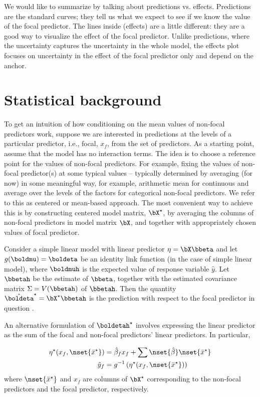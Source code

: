 We would like to summarize by talking about predictions vs. effects. Predictions are the standard curves; they tell us what we expect to see if we know the value of the focal predictor. The lines inside (effects) are a little different: they are a good way to visualize the effect of the focal predictor. Unlike predictions, where the uncertainty captures the uncertainty in the whole model, the effects plot focuses on uncertainty in the effect of the focal predictor only and depend on the anchor.



\section{Statistical background}

To get an intuition of how conditioning on the mean values of non-focal predictors work, suppose we are interested in predictions at the levels of a particular predictor, i.e., focal, $x_f$, from the set of predictors. As a starting point, assume that the model has no interaction terms. The idea is to choose a reference point for the values of non-focal predictors. For example, fixing the values of non-focal predictor(s) at some typical values -- typically determined by averaging (for now) in some meaningful way, for example, arithmetic mean  for continuous and average over the levels of the factors for categorical non-focal predictors. We refer to this as centered or mean-based approach. The most convenient way to achieve this is by constructing centered model matrix, $\bX^\star$, by averaging the columns of non-focal predictors in model matrix $\bX$, and together with appropriately chosen values of focal predictor.


Consider a simple linear model with linear predictor $\eta = \bX\bbeta$ and let $g(\boldmu) = \boldeta$ be an identity link function (in the case of simple linear model), where $\boldmuh$ is the expected value of response variable $\hat{y}$. Let $\bbetah$ be the estimate of $\bbeta$, together with the estimated covariance matrix $\Sigma = V(\bbetah)$ of $\bbetah$. Then the quantity $\hat{\boldeta}^\star = \bX^\star\bbetah$ is the prediction with respect to the focal predictor in question \citep{fox2009effect}.

An alternative formulation of $\boldetah^\star$ involves expressing the linear predictor as the sum of the focal and non-focal predictors' linear predictors. In particular, 

\begin{align}\label{eq:eta_mean}
\eta^\star(x_f, \nset{{\bar{x}^\star}}) &= \hat{\beta}_f x_f + \sum \nset{\hat{\beta}} \nset{{\bar{x}^\star}} \\
\hat{y}_f  &= g^{-1} \left(\eta^\star(x_f, \nset{{\bar{x}^\star}})\right)
\end{align}
where $\nset{{\bar{x}^\star}}$ and $x_f$ are columns of $\bX^\star$ corresponding to the non-focal predictors and the focal predictor, respectively.


